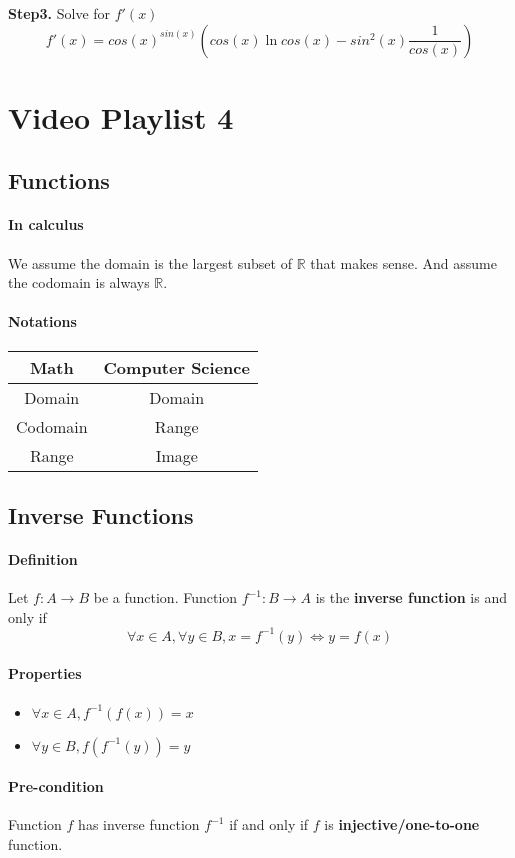 \documentclass{article}
\begin{document}
	\textbf{Step3.} Solve for $f'(x)$
	\[
	f'(x) = cos(x)^{sin(x)} (cos(x) \ln{cos(x)} - sin^2(x)\frac{1}{cos(x)})
	\]

	\section{Video Playlist 4}
	\subsection{Functions}
	\paragraph{In calculus} We assume the domain is the largest subset of $\mathbb{R}$ that makes sense. And assume the codomain is always $\mathbb{R}$.
	\paragraph{Notations}
	\begin{tabular}{c|c}
		\hline
		Math & Computer Science \\
		\hline
		Domain & Domain \\
		\hline
		Codomain & Range \\
		\hline
		Range & Image \\
		\hline
	\end{tabular}
	\subsection{Inverse Functions}
	\paragraph{Definition} Let $f: A \to B$ be a function. Function $f^{-1}:B \to A$ is the \textbf{inverse function} is and only if 
	\[
	\forall x \in A, \forall y \in B, x = f^{-1}(y) \iff y = f(x)
	\]
	\paragraph{Properties}
	\begin{itemize}
		\item $\forall x \in A, f^{-1}(f(x)) = x$
		\item $\forall y \in B, f(f^{-1}(y)) = y$
	\end{itemize}
	\paragraph{Pre-condition} Function $f$ has inverse function $f^{-1}$ if and only if $f$ is \textbf{injective/one-to-one} function.
\end{document}
